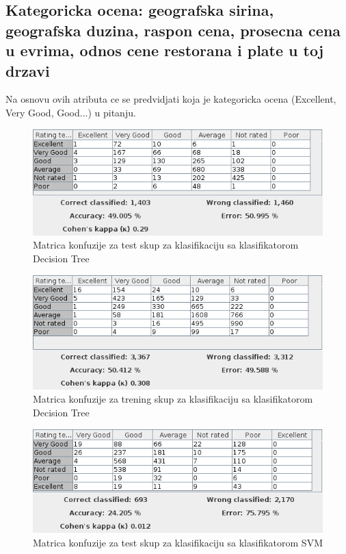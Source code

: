 \documentclass[11pt]{article} %
\begin{document}
\newpage
\subsection{Kategoricka ocena: geografska sirina, geografska duzina, raspon cena, prosecna cena u evrima, odnos cene restorana i plate u toj drzavi}
Na osnovu ovih atributa ce se predvidjati koja je kategoricka ocena (Excellent, Very Good, Good...) u pitanju.

\begin{figure}[h!]
	\centering
	\includegraphics[width=1.1\textwidth]{ratingClassificationTest/DecisionTree}
	\caption{Matrica konfuzije za test skup za klasifikaciju sa klasifikatorom Decision Tree}
\end{figure}
\begin{figure}[h!]
	\centering
	\includegraphics[width=1.1\textwidth]{ratingClassificationTraining/DecisionTree}
	\caption{Matrica konfuzije za trening skup za klasifikaciju sa klasifikatorom Decision Tree}
\end{figure}
\newline
\begin{figure}[h!]
	\centering
	\includegraphics[width=1.1\textwidth]{ratingClassificationTest/SVM}
	\caption{Matrica konfuzije za test skup za klasifikaciju sa klasifikatorom SVM}
\end{figure}
\end{document}
